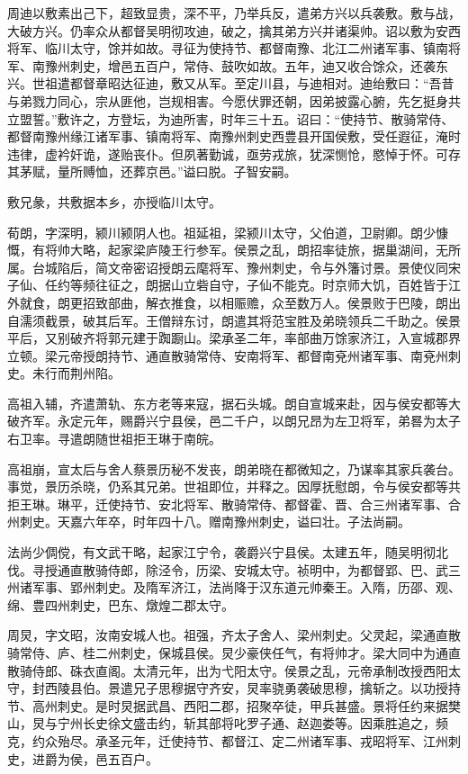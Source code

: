\documentclass[]{article}
\begin{document}
周迪以敷素出己下，超致显贵，深不平，乃举兵反，遣弟方兴以兵袭敷。敷与战，大破方兴。仍率众从都督吴明彻攻迪，破之，擒其弟方兴并诸渠帅。诏以敷为安西将军、临川太守，馀并如故。寻征为使持节、都督南豫、北江二州诸军事、镇南将军、南豫州刺史，增邑五百户，常侍、鼓吹如故。五年，迪又收合馀众，还袭东兴。世祖遣都督章昭达征迪，敷又从军。至定川县，与迪相对。迪绐敷曰：``吾昔与弟戮力同心，宗从匪他，岂规相害。今愿伏罪还朝，因弟披露心腑，先乞挺身共立盟誓。''敷许之，方登坛，为迪所害，时年三十五。诏曰：``使持节、散骑常侍、都督南豫州缘江诸军事、镇南将军、南豫州刺史西豊县开国侯敷，受任遐征，淹时违律，虚衿奸诡，遂贻丧仆。但夙著勤诚，亟劳戎旅，犹深恻怆，愍悼于怀。可存其茅赋，量所赙恤，还葬京邑。''谥曰脱。子智安嗣。

敷兄彖，共敷据本乡，亦授临川太守。

荀朗，字深明，颍川颍阴人也。祖延祖，梁颍川太守，父伯道，卫尉卿。朗少慷慨，有将帅大略，起家梁庐陵王行参军。侯景之乱，朗招率徒旅，据巢湖间，无所属。台城陷后，简文帝密诏授朗云麾将军、豫州刺史，令与外籓讨景。景使仪同宋子仙、任约等频往征之，朗据山立砦自守，子仙不能克。时京师大饥，百姓皆于江外就食，朗更招致部曲，解衣推食，以相赈赡，众至数万人。侯景败于巴陵，朗出自濡须截景，破其后军。王僧辩东讨，朗遣其将范宝胜及弟晓领兵二千助之。侯景平后，又别破齐将郭元建于踟蹰山。梁承圣二年，率部曲万馀家济江，入宣城郡界立顿。梁元帝授朗持节、通直散骑常侍、安南将军、都督南兗州诸军事、南兗州刺史。未行而荆州陷。

高祖入辅，齐遣萧轨、东方老等来寇，据石头城。朗自宣城来赴，因与侯安都等大破齐军。永定元年，赐爵兴宁县侯，邑二千户，以朗兄昂为左卫将军，弟晷为太子右卫率。寻遣朗随世祖拒王琳于南皖。

高祖崩，宣太后与舍人蔡景历秘不发丧，朗弟晓在都微知之，乃谋率其家兵袭台。事觉，景历杀晓，仍系其兄弟。世祖即位，并释之。因厚抚慰朗，令与侯安都等共拒王琳。琳平，迁使持节、安北将军、散骑常侍、都督霍、晋、合三州诸军事、合州刺史。天嘉六年卒，时年四十八。赠南豫州刺史，谥曰壮。子法尚嗣。

法尚少倜傥，有文武干略，起家江宁令，袭爵兴宁县侯。太建五年，随吴明彻北伐。寻授通直散骑侍郎，除泾令，历梁、安城太守。祯明中，为都督郢、巴、武三州诸军事、郢州刺史。及隋军济江，法尚降于汉东道元帅秦王。入隋，历邵、观、绵、豊四州刺史，巴东、燉煌二郡太守。

周炅，字文昭，汝南安城人也。祖强，齐太子舍人、梁州刺史。父灵起，梁通直散骑常侍、庐、桂二州刺史，保城县侯。炅少豪侠任气，有将帅才。梁大同中为通直散骑侍郎、硃衣直阁。太清元年，出为弋阳太守。侯景之乱，元帝承制改授西阳太守，封西陵县伯。景遣兄子思穆据守齐安，炅率骁勇袭破思穆，擒斩之。以功授持节、高州刺史。是时炅据武昌、西阳二郡，招聚卒徒，甲兵甚盛。景将任约来据樊山，炅与宁州长史徐文盛击约，斩其部将叱罗子通、赵迦娄等。因乘胜追之，频克，约众殆尽。承圣元年，迁使持节、都督江、定二州诸军事、戎昭将军、江州刺史，进爵为侯，邑五百户。
\end{document}
